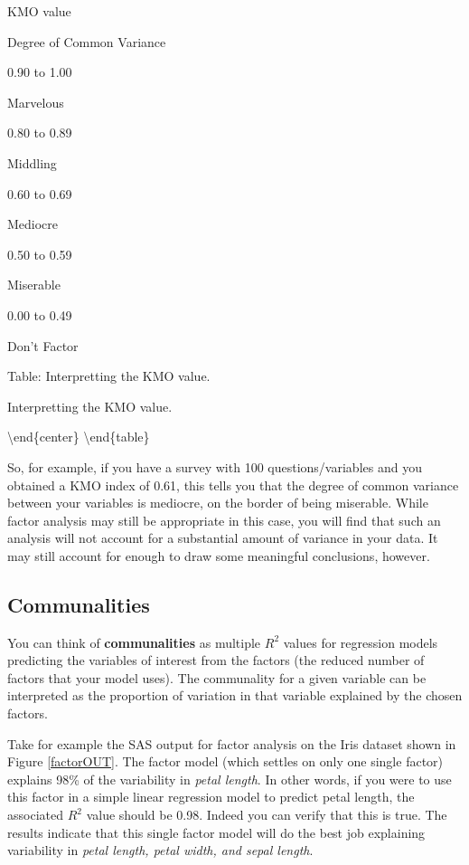\documentclass[
]{article}
\theoremstyle{definition}
\theoremstyle{definition}
\theoremstyle{definition}
\theoremstyle{definition}
\theoremstyle{remark}
\begin{document}
KMO value

Degree of Common Variance

0.90 to 1.00

Marvelous

0.80 to 0.89

Middling

0.60 to 0.69

Mediocre

0.50 to 0.59

Miserable

0.00 to 0.49

Don't Factor

Table: \label{tab:KMO} Interpretting the KMO value. \cite{KMO}

\caption{Interpretting the KMO value. }
\label{table:KMO}

\textbackslash end\{center\}
\textbackslash end\{table\}

So, for example, if you have a survey with 100 questions/variables and you obtained a KMO index of 0.61, this tells you that the degree of common variance between your variables is mediocre, on the border of being miserable. While factor analysis may still be appropriate in this case, you will find that such an analysis will not account for a substantial amount of variance in your data. It may still account for enough to draw some meaningful conclusions, however.

\hypertarget{communalities}{%
\subsection{Communalities}\label{communalities}}

You can think of \textbf{communalities} as multiple \(R^2\) values for regression models predicting the variables of interest from the factors (the reduced number of factors that your model uses). The communality for a given variable can be interpreted as the proportion of variation in that variable explained by the chosen factors.

Take for example the SAS output for factor analysis on the Iris dataset shown in Figure \ref{factorOUT}. The factor model (which settles on only one single factor) explains 98\% of the variability in \emph{petal length}. In other words, if you were to use this factor in a simple linear regression model to predict petal length, the associated \(R^2\) value should be 0.98. Indeed you can verify that this is true. The results indicate that this single factor model will do the best job explaining variability in \emph{petal length, petal width, and sepal length}.
\end{document}
